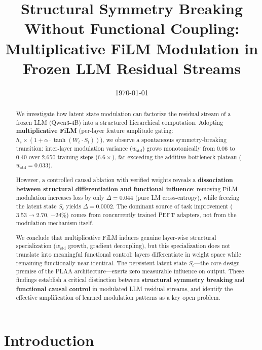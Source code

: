 \documentclass[11pt,a4paper]{article}
\title{
  \textbf{Structural Symmetry Breaking Without Functional Coupling:\\
  Multiplicative FiLM Modulation in Frozen LLM Residual Streams}
}
\author{
  Xiao Ouyang \textup{(\begin{CJK}{UTF8}{gbsn}欧阳潇\end{CJK})}
}
\date{\today}
\newcommand{\St}{S_t}
\begin{document}
\maketitle
\thispagestyle{empty}

\begin{abstract}
We investigate how latent state modulation can factorize the residual stream of a
frozen LLM (Qwen3-4B) into a structured hierarchical computation. Adopting
\textbf{multiplicative FiLM} (per-layer feature amplitude gating:
$h_s \times (1 + \alpha\cdot\tanh(W_\ell \cdot S_t))$), we observe a spontaneous
symmetry-breaking transition: inter-layer modulation variance ($w_{\mathrm{std}}$)
grows monotonically from $0.06$ to $0.40$ over 2,650 training steps ($6.6\times$),
far exceeding the additive bottleneck plateau ($w_{\mathrm{std}} = 0.033$).

However, a controlled causal ablation with verified weights reveals a
\textbf{dissociation between structural differentiation and functional influence}:
removing FiLM modulation increases loss by only $\Delta = 0.044$ (pure LM
cross-entropy), while freezing the latent state $\St$ yields $\Delta = 0.0002$. The
dominant source of task improvement ($3.53 \to 2.70$, $-24\%$) comes from
concurrently trained PEFT adapters, not from the modulation mechanism itself.

We conclude that multiplicative FiLM induces genuine layer-wise structural
specialization ($w_{\mathrm{std}}$ growth, gradient decoupling), but this
specialization does not translate into meaningful functional control: layers
differentiate in weight space while remaining functionally near-identical. The
persistent latent state $\St$---the core design premise of the PLAA
architecture---exerts zero measurable influence on output. These findings establish a
critical distinction between \textbf{structural symmetry breaking} and
\textbf{functional causal control} in modulated LLM residual streams, and identify
the effective amplification of learned modulation patterns as a key open problem.
\end{abstract}

\newpage
\setcounter{page}{1}

\section{Introduction}
\end{document}
